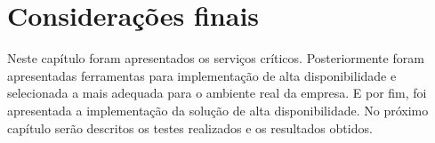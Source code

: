\section{Considerações finais}

Neste capítulo foram apresentados os serviços críticos. Posteriormente foram apresentadas ferramentas para implementação de alta disponibilidade 
e selecionada a mais adequada para o ambiente real da empresa. E por fim, foi apresentada a implementação da solução de alta disponibilidade. 
No próximo capítulo serão descritos os testes realizados e os resultados obtidos.

